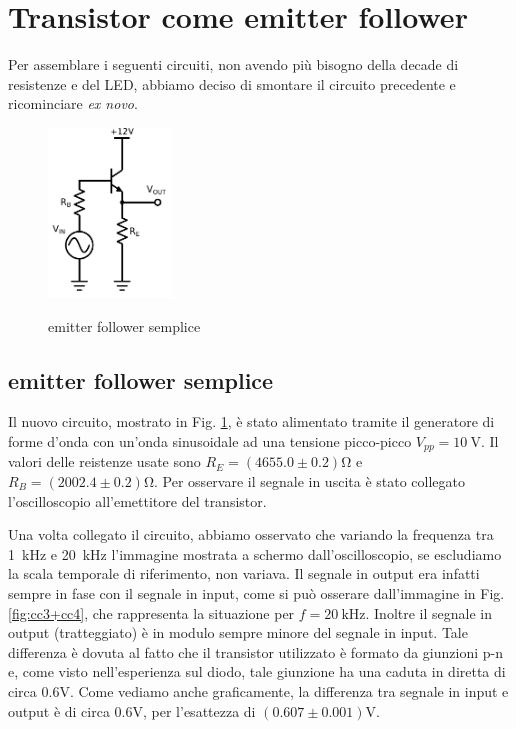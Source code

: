 \section{Transistor come emitter follower}

Per assemblare i seguenti circuiti, non avendo più bisogno della decade di resistenze e del LED, abbiamo deciso di smontare il circuito precedente e ricominciare \emph{ex novo}.

\begin{figure}
	\caption{emitter follower semplice}
	\includegraphics[height=45mm]{cc3.pdf}
	\label{fig:cc3}
\end{figure}

\subsection{emitter follower semplice}
Il nuovo circuito, mostrato in Fig. \ref{fig:cc3}, è stato alimentato tramite il generatore di forme d'onda con un'onda sinusoidale ad una tensione picco-picco $V_{pp} = \SI{10}{\volt}$.
Il valori delle reistenze usate sono $R_E = (4655.0 \pm 0.2)\si{\ohm}$ e $R_B = (2002.4 \pm 0.2)\si{\ohm}$.
Per osservare il segnale in uscita è stato collegato l'oscilloscopio all'emettitore del transistor.

Una volta collegato il circuito, abbiamo osservato che variando la frequenza tra \SI{1}{\kilo\hertz} e \SI{20}{\kilo\hertz} l'immagine mostrata a schermo dall'oscilloscopio, se escludiamo la scala temporale di riferimento, non variava.
Il segnale in output era infatti sempre in fase con il segnale in input, come si può osserare dall'immagine in Fig. \ref{fig:cc3+cc4}, che rappresenta la situazione per $f = \SI{20}{\kilo\hertz}$.
Inoltre il segnale in output (tratteggiato) è in modulo sempre minore del segnale in input.
Tale differenza è dovuta al fatto che il transistor utilizzato è formato da giunzioni p-n e, come visto nell'esperienza sul diodo, tale giunzione ha una caduta in diretta di circa $0.6\si{\volt}$. Come vediamo anche graficamente, la differenza tra segnale in input e output è di circa $0.6\si{\volt}$, per l'esattezza di $(0.607\pm0.001)\si{\volt}$.

